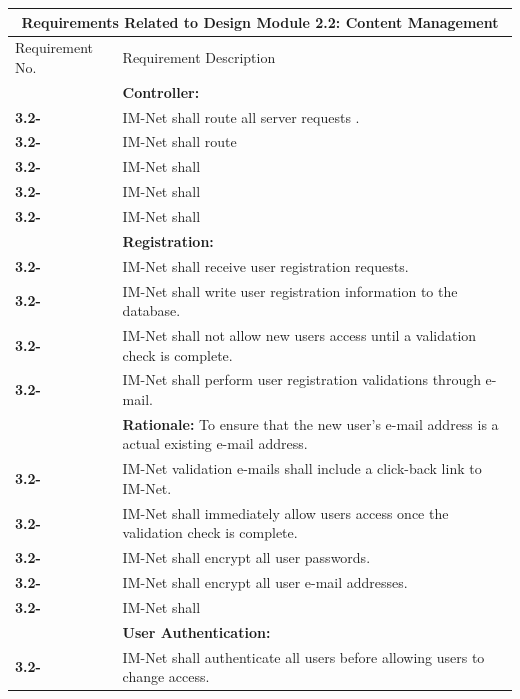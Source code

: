 \documentclass[letterpaper,12pt]{article}
\newcounter{rcounter}						%
\newcommand\rnumber{\stepcounter{rcounter}\arabic{rcounter}}
\begin{document}
{\setcounter{rcounter}{0}
\begin{center}
\begin{tabular}{|l|p{6in}|}
\hline 
\multicolumn{2}{|c|}{\textbf{Requirements Related to Design Module 2.2: Content Management}} \\ 
\hline 
Requirement No. & Requirement Description \\ 
\hline
& \textbf{Controller:} \\
\hline
\textbf{3.2-\rnumber} & IM-Net shall route all server requests . \\ 
\hline 
\textbf{3.2-\rnumber} & IM-Net shall route  \\ 
\hline 
\textbf{3.2-\rnumber} & IM-Net shall  \\ 
\hline 
\textbf{3.2-\rnumber} & IM-Net shall  \\ 
\hline 
\textbf{3.2-\rnumber} & IM-Net shall  \\ 
\hline 
& \textbf{Registration:} \\
\hline
\textbf{3.2-\rnumber} & IM-Net shall receive user registration requests. \\
\hline 
\textbf{3.2-\rnumber} & IM-Net shall write user registration information to the database. \\ 
\hline 
\textbf{3.2-\rnumber} & IM-Net shall not allow new users access until a validation check is complete. \\ 
\hline 
\textbf{3.2-\rnumber} & IM-Net shall perform user registration validations through e-mail. \\
& \textbf{Rationale:} To ensure that the new user's e-mail address is a actual existing e-mail address.\\
\hline 
\textbf{3.2-\rnumber} & IM-Net validation e-mails shall include a click-back link to IM-Net. \\ 
\hline 
\textbf{3.2-\rnumber} & IM-Net shall immediately allow users access once the validation check is complete. \\ 
\hline 
\textbf{3.2-\rnumber} & IM-Net shall encrypt all user passwords. \\ 
\hline 
\textbf{3.2-\rnumber} & IM-Net shall encrypt all user e-mail addresses. \\ 
\hline 
\textbf{3.2-\rnumber} & IM-Net shall  \\ 
\hline 
& \textbf{User Authentication:} \\
\hline
\textbf{3.2-\rnumber} & IM-Net shall authenticate all users before allowing users to change access. \\ 
\hline 

\end{tabular}
\end{center}}
\end{document}
